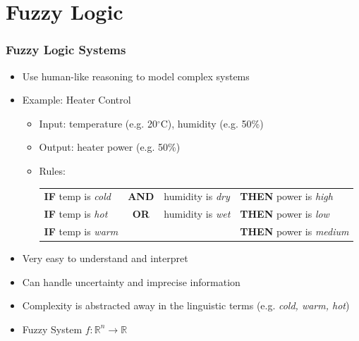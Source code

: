 \documentclass[
	10pt,
	t		%
]{beamer}
\begin{document}
\section{Fuzzy Logic}
\begin{frame}
	\frametitle{Fuzzy Logic Systems}

	\begin{itemize}
		\item Use human-like reasoning to model complex systems
		\item Example: Heater Control
		      \begin{itemize}
			      \item Input: temperature (e.g. 20$^{\circ}$C), humidity (e.g. 50\%)
			      \item Output: heater power (e.g. 50\%)
			      \item Rules:
			            \begin{tabular}{lcll}
				            \textbf{IF}  temp is \textit{cold} & \textbf{AND} & humidity is \textit{dry} & \textbf{THEN}  power is \textit{high}   \\
				            \textbf{IF}  temp is \textit{hot}  & \textbf{OR}  & humidity is \textit{wet} & \textbf{THEN}  power is \textit{low}    \\
				            \textbf{IF}  temp is \textit{warm} &              &                          & \textbf{THEN}  power is \textit{medium} \\
			            \end{tabular}
		      \end{itemize}
		\item Very easy to understand and interpret
		\item Can handle uncertainty and imprecise information
		\item Complexity is abstracted away in the linguistic terms (e.g. \textit{cold, warm, hot})
		\item Fuzzy System $f: \mathbb{R}^n \rightarrow \mathbb{R}$
	\end{itemize}

\end{frame}
\end{document}
